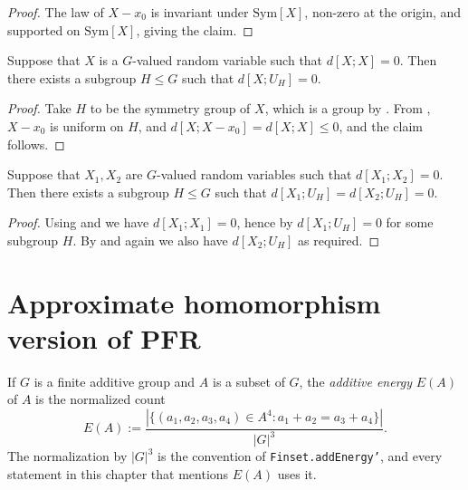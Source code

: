 \begin{proof}\leanok  The law of $X-x_0$ is invariant under $\mathrm{Sym}[X]$, non-zero at the origin, and supported on  $\mathrm{Sym}[X]$, giving the claim.
\end{proof}


\begin{lemma}\label{lem:100pc-self}
  \leanok
  Suppose that $X$ is a $G$-valued random variable such that
  $d[X ;X]=0$. Then there exists a subgroup $H \leq G$ such that $d[X ;U_H] = 0$.
\end{lemma}

\begin{proof}\leanok
Take $H$ to be the symmetry group of $X$, which is a group by . From , $X-x_0$ is uniform on $H$, and $d[X ;X-x_0] = d[X ;X] \leq 0$, and the claim follows.
\end{proof}

\begin{corollary}\label{lem:100pc}
  \leanok
  Suppose that $X_1,X_2$ are $G$-valued random variables such that
  $d[X_1;X_2]=0$. Then there exists a subgroup $H \leq G$ such that $d[X_1;U_H] = d[X_2;U_H] = 0$.
\end{corollary}

\begin{proof}\leanok
Using  and  we have $d[X_1;X_1]=0$, hence by  $d[X_1;U_H]=0$ for some subgroup $H$.  By  and  again we also have $d[X_2;U_H]$ as required.
\end{proof}


\chapter{Approximate homomorphism version of PFR}

\begin{definition}
  \label{energy-def}
  \leanok
  If $G$ is a finite additive group and $A$ is a subset of $G$, the \emph{additive energy}
  $E(A)$ of $A$ is the normalized count
  $$ E(A) := \frac{|\{(a_1,a_2,a_3,a_4) \in A^4 : a_1+a_2 = a_3+a_4\}|}{|G|^3}. $$
  The normalization by $|G|^3$ is the convention of \texttt{Finset.addEnergy'}, and every
  statement in this chapter that mentions $E(A)$ uses it.
\end{definition}

